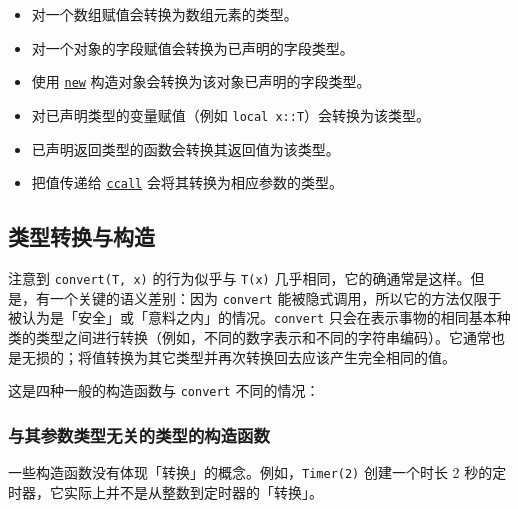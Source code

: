 \begin{itemize}
\item 对一个数组赋值会转换为数组元素的类型。


\item 对一个对象的字段赋值会转换为已声明的字段类型。


\item 使用 \hyperlink{13888762393600028594}{\texttt{new}} 构造对象会转换为该对象已声明的字段类型。


\item 对已声明类型的变量赋值（例如 \texttt{local x::T}）会转换为该类型。


\item 已声明返回类型的函数会转换其返回值为该类型。


\item 把值传递给 \hyperlink{14245046751182637566}{\texttt{ccall}} 会将其转换为相应参数的类型。

\end{itemize}


\hypertarget{11541557100875125079}{}


\subsection{类型转换与构造}



注意到 \texttt{convert(T, x)} 的行为似乎与 \texttt{T(x)} 几乎相同，它的确通常是这样。但是，有一个关键的语义差别：因为 \texttt{convert} 能被隐式调用，所以它的方法仅限于被认为是「安全」或「意料之内」的情况。\texttt{convert} 只会在表示事物的相同基本种类的类型之间进行转换（例如，不同的数字表示和不同的字符串编码）。它通常也是无损的；将值转换为其它类型并再次转换回去应该产生完全相同的值。



这是四种一般的构造函数与 \texttt{convert} 不同的情况：



\hypertarget{17931790162561418365}{}


\subsubsection{与其参数类型无关的类型的构造函数}



一些构造函数没有体现「转换」的概念。例如，\texttt{Timer(2)} 创建一个时长 2 秒的定时器，它实际上并不是从整数到定时器的「转换」。



\hypertarget{8367796589961400339}{}


